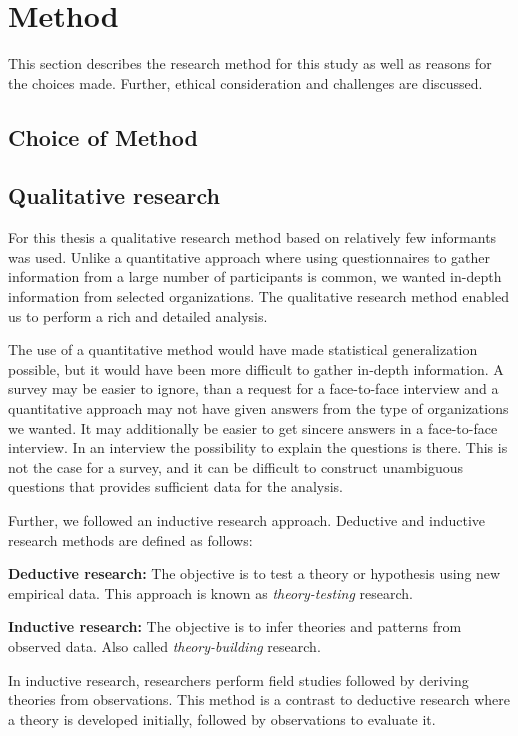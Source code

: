 \chapter{Method}
This section describes the research method for this study as well as reasons for the choices made. Further, ethical consideration and challenges are discussed.
\section{Choice of Method}


\section{Qualitative research}
\label{sec:qualitativeresearch}
For this thesis a qualitative research method based on relatively few informants was used. Unlike a quantitative approach where using questionnaires to gather information from a large number of participants is common, we wanted in-depth information from selected organizations. The qualitative research method enabled us to perform a rich and detailed analysis. 

The use of a quantitative method would have made statistical generalization possible, but it would have been more difficult to gather in-depth information. A survey may be easier to ignore, than a request for a face-to-face interview and a quantitative approach may not have given answers from the type of organizations we wanted. It may additionally be easier to get sincere answers in a face-to-face interview. In an interview the possibility to explain the questions is there. This is not the case for a survey, and it can be difficult to construct unambiguous questions that provides sufficient data for the analysis.

Further, we followed an inductive research approach. Deductive and inductive research methods are defined as follows\cite{bhattacherjee2012social}: 

\textbf{Deductive research:} The objective is to test a theory or hypothesis using new empirical data. This approach is known as \emph{theory-testing} research.

\textbf{Inductive research:} The objective is to infer theories and patterns from observed data. Also called \emph{theory-building} research.

In inductive research, researchers perform field studies followed by deriving theories from observations. This method is a contrast to deductive research where a theory is developed initially, followed by observations to evaluate it\cite{oates2005researching}.

